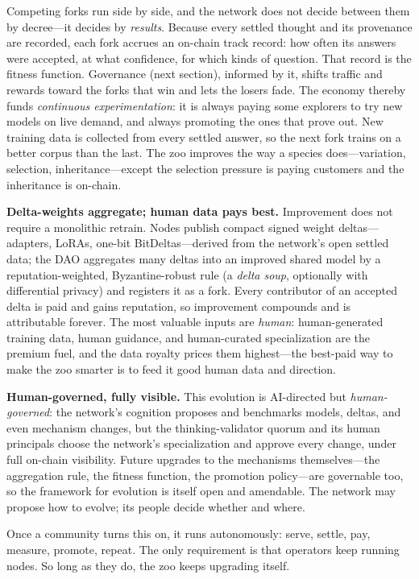 \documentclass[11pt]{article}
\begin{document}
Competing forks run side by side, and the network does not decide between them by decree---it decides by \emph{results}. Because every settled thought and its provenance are recorded, each fork accrues an on-chain track record: how often its answers were accepted, at what confidence, for which kinds of question. That record is the fitness function. Governance (next section), informed by it, shifts traffic and rewards toward the forks that win and lets the losers fade. The economy thereby funds \emph{continuous experimentation}: it is always paying some explorers to try new models on live demand, and always promoting the ones that prove out. New training data is collected from every settled answer, so the next fork trains on a better corpus than the last. The zoo improves the way a species does---variation, selection, inheritance---except the selection pressure is paying customers and the inheritance is on-chain.

\medskip\noindent\textbf{Delta-weights aggregate; human data pays best.} Improvement does not require a monolithic retrain. Nodes publish compact signed weight deltas---adapters, LoRAs, one-bit BitDeltas---derived from the network's open settled data; the DAO aggregates many deltas into an improved shared model by a reputation-weighted, Byzantine-robust rule (a \emph{delta soup}, optionally with differential privacy) and registers it as a fork. Every contributor of an accepted delta is paid and gains reputation, so improvement compounds and is attributable forever. The most valuable inputs are \emph{human}: human-generated training data, human guidance, and human-curated specialization are the premium fuel, and the data royalty prices them highest---the best-paid way to make the zoo smarter is to feed it good human data and direction.

\medskip\noindent\textbf{Human-governed, fully visible.} This evolution is AI-directed but \emph{human-governed}: the network's cognition proposes and benchmarks models, deltas, and even mechanism changes, but the thinking-validator quorum and its human principals choose the network's specialization and approve every change, under full on-chain visibility. Future upgrades to the mechanisms themselves---the aggregation rule, the fitness function, the promotion policy---are governable too, so the framework for evolution is itself open and amendable. The network may propose how to evolve; its people decide whether and where.

Once a community turns this on, it runs autonomously: serve, settle, pay, measure, promote, repeat. The only requirement is that operators keep running nodes. So long as they do, the zoo keeps upgrading itself.
\end{document}
